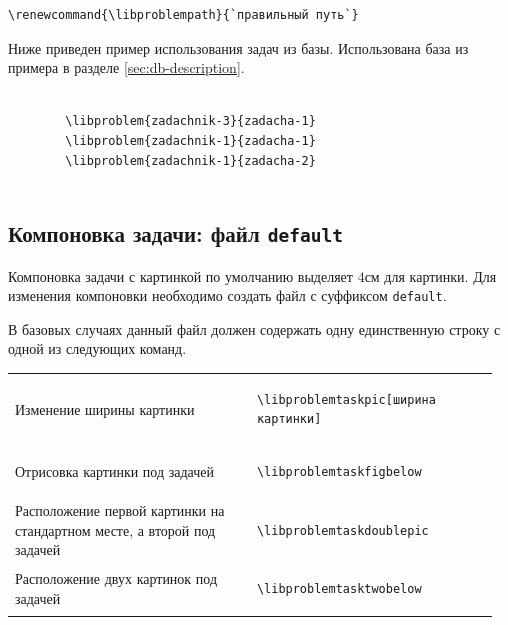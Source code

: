 \begin{lstlisting}[gobble = 3]
    \renewcommand{\libproblempath}{`правильный путь`}
\end{lstlisting}

Ниже приведен пример использования задач из базы. Использована база из примера в разделе
\ref{sec:db-description}.


\begin{lstlisting}[gobble = 3]
    
        \libproblem{zadachnik-3}{zadacha-1}
        \libproblem{zadachnik-1}{zadacha-1}
        \libproblem{zadachnik-1}{zadacha-2}
    
\end{lstlisting}




\subsection{Компоновка задачи: файл \texttt{default}}
\label{sec:db-default}

Компоновка задачи с картинкой по умолчанию выделяет $4\unit{см}$ для картинки. Для изменения компоновки
необходимо создать файл с суффиксом \texttt{default}.

В базовых случаях данный файл должен содержать одну единственную строку с одной из следующих команд.

\smallskip

\noindent
\begin{tabular}{S{0.48\linewidth} S{0.485\linewidth}}
    Изменение ширины картинки &
        \begin{lstlisting}[gobble = 11]
            \libproblemtaskpic[ширина картинки]
        \end{lstlisting} \\
    Отрисовка картинки под задачей &
        \begin{lstlisting}[gobble = 11]
            \libproblemtaskfigbelow
        \end{lstlisting} \\
    Расположение первой картинки на стандартном месте, а второй под задачей &
        \begin{lstlisting}[gobble = 11]
            \libproblemtaskdoublepic
        \end{lstlisting} \\
    Расположение двух картинок под задачей &
        \begin{lstlisting}[gobble = 11]
            \libproblemtasktwobelow
        \end{lstlisting}
\end{tabular}

